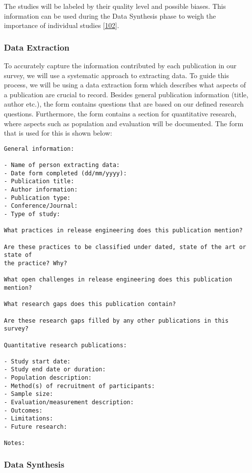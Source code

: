 \documentclass[]{book}
\begin{document}
The studies will be labeled by their quality level and possible biases.
This information can be used during the Data Synthesis phase to weigh
the importance of individual studies
{[}\protect\hyperlink{ref-kitchenham2004procedures}{102}{]}.

\subsubsection{Data Extraction}\label{data-extraction}

To accurately capture the information contributed by each publication in
our survey, we will use a systematic approach to extracting data. To
guide this process, we will be using a data extraction form which
describes what aspects of a publication are crucial to record. Besides
general publication information (title, author etc.), the form contains
questions that are based on our defined research questions. Furthermore,
the form contains a section for quantitative research, where aspects
such as population and evaluation will be documented. The form that is
used for this is shown below:

\begin{verbatim}
General information:

- Name of person extracting data:
- Date form completed (dd/mm/yyyy):
- Publication title:
- Author information:
- Publication type:
- Conference/Journal:
- Type of study:

What practices in release engineering does this publication mention?

Are these practices to be classified under dated, state of the art or state of
the practice? Why?

What open challenges in release engineering does this publication mention?

What research gaps does this publication contain?

Are these research gaps filled by any other publications in this survey?

Quantitative research publications:

- Study start date:
- Study end date or duration:
- Population description:
- Method(s) of recruitment of participants:
- Sample size:
- Evaluation/measurement description:
- Outcomes:
- Limitations:
- Future research:

Notes:
\end{verbatim}

\subsubsection{Data Synthesis}\label{data-synthesis}
\end{document}
